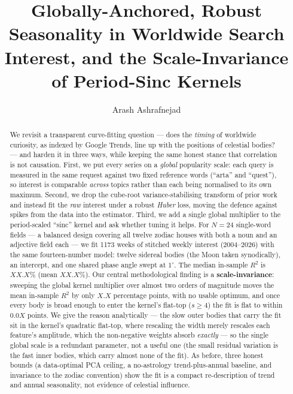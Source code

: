 \documentclass[11pt]{artaquest}
\title{Globally-Anchored, Robust Seasonality in Worldwide Search Interest, and the
       Scale-Invariance of Period-Sinc Kernels}
\author{Arash Ashrafnejad\affmark{1}}
\affiliation{\affmark{1}ArtaQuest Foundation}
\newcommand{\headlineN}{24}            %
\newcommand{\headlineW}{1173}          %
\newcommand{\medianR}{XX.X}            %
\newcommand{\meanR}{XX.X}              %
\newcommand{\scaleEps}{X.X}            %
\newcommand{\scaleFlat}{0.0X}          %
\begin{document}
\maketitle

\begin{abstract}
We revisit a transparent curve-fitting question --- does the \emph{timing} of worldwide curiosity, as
indexed by Google Trends, line up with the positions of celestial bodies? --- and harden it in three
ways, while keeping the same honest stance that correlation is not causation. First, we put every series
on a \emph{global} popularity scale: each query is measured in the same request against two fixed
reference words (``arta'' and ``quest''), so interest is comparable \emph{across} topics rather than each
being normalised to its own maximum. Second, we drop the cube-root variance-stabilising transform of
prior work and instead fit the \emph{raw} interest under a robust \emph{Huber} loss, moving the defence
against spikes from the data into the estimator. Third, we add a single global multiplier to the
period-scaled ``sinc'' kernel and ask whether tuning it helps. For $N=\headlineN{}$ single-word fields ---
a balanced design covering all twelve zodiac houses with both a noun and an adjective field each --- we
fit \headlineW{} weeks of stitched weekly interest (2004--2026) with the same fourteen-number model:
twelve sidereal bodies (the Moon taken synodically), an intercept, and one shared phase angle swept at
$1^\circ$. The median in-sample $R^2$ is $\medianR\%$ (mean $\meanR\%$). Our central methodological
finding is a \textbf{scale-invariance}: sweeping the global kernel multiplier over almost two orders of
magnitude moves the mean in-sample $R^2$ by only $\scaleEps$ percentage points, with no usable optimum, and
once every body is broad enough to enter the kernel's flat-top ($s\ge4$) the fit is flat to within
$\scaleFlat$ points. We give the reason analytically --- the slow outer bodies that carry the fit sit in
the kernel's quadratic flat-top, where rescaling the width merely rescales each feature's amplitude, which
the non-negative weights absorb \emph{exactly} --- so the single global scale is a redundant parameter, not
a useful one (the small residual variation is the fast inner bodies, which carry almost none of the fit). As before, three honest bounds (a data-optimal PCA ceiling, a no-astrology trend-plus-annual
baseline, and invariance to the zodiac convention) show the fit is a compact re-description of trend and
annual seasonality, not evidence of celestial influence.
\end{abstract}
\end{document}
